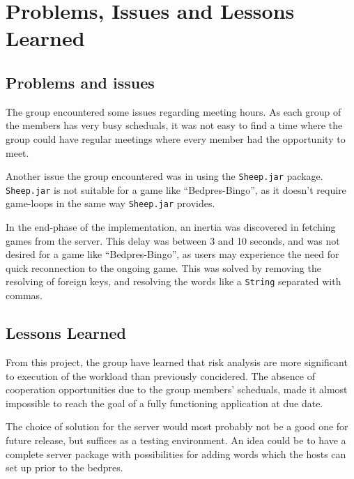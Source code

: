 \section{Problems, Issues and Lessons Learned}
\label{sec:issues}

\subsection{Problems and issues}
The group encountered some issues regarding meeting hours. As each group
of the members has very busy scheduals, it was not easy to find a time where the group could have regular meetings where every member
had the opportunity to meet.

Another issue the group encountered
was in using the \texttt{Sheep.jar} package. \texttt{Sheep.jar} is not
suitable for a game like ``Bedpres-Bingo'', as it doesn't require game-loops in the same way \texttt{Sheep.jar} provides.

In the end-phase of the implementation, an inertia was discovered in
fetching games from the server. This delay was between 3 and 10 seconds,
and was not desired for a game like ``Bedpres-Bingo'', as users may
experience the need for quick reconnection to the ongoing game. This was solved by removing the resolving of foreign keys, and resolving the words like a \texttt{String} separated with commas.

\subsection{Lessons Learned}
From this project, the group have learned that risk analysis are more
significant to execution of the workload than previously concidered.
The absence of cooperation opportunities due to the group members' scheduals,
made it almost impossible to reach the goal of a fully functioning application
at due date.

The choice of solution for the server would most probably not be a good
one for future release, but suffices as a testing environment. An idea
could be to have a complete server package with possibilities for adding
words which the hosts can set up prior to the bedpres.